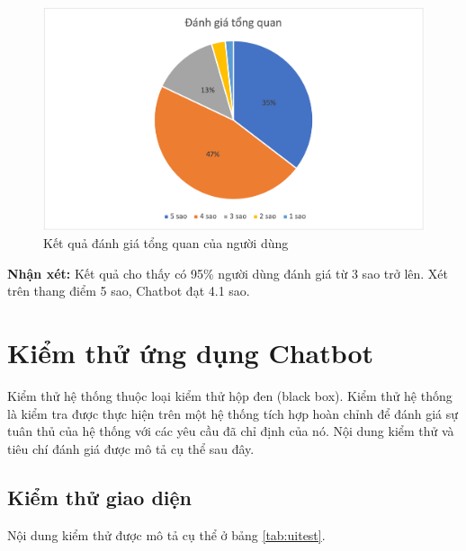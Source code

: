 \begin{figure}[ht!]
    \centering
    \includegraphics[scale=0.91]{thesis/chatbot/ketqua/img/tieuchi8.png}
    \caption{Kết quả đánh giá tổng quan của người dùng}
    \label{fig:tieuchi8}
\end{figure}

\textbf{Nhận xét:}
Kết quả cho thấy có 95\% người dùng đánh giá từ 3 sao trở lên.
Xét trên thang điểm 5 sao, Chatbot đạt 4.1 sao.

\section{Kiểm thử ứng dụng Chatbot}
Kiểm thử hệ thống thuộc loại kiểm thử hộp đen (black box). Kiểm thử
hệ thống là kiểm tra được thực hiện trên một hệ thống tích hợp
hoàn chỉnh để đánh giá sự tuân thủ của hệ thống với các yêu cầu đã
chỉ định của nó. Nội dung kiểm thử và tiêu chí đánh giá được
mô tả cụ thể sau đây.

\subsection{Kiểm thử giao diện}
Nội dung kiểm thử được mô tả cụ thể ở bảng \ref{tab:uitest}.

